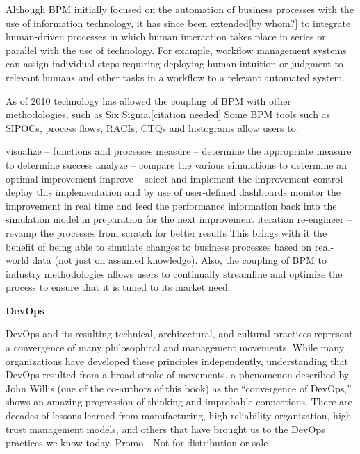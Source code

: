 \documentclass[finnish,12pt,a4paper,pdftex]{article}
\begin{document}
Although BPM initially focused on the automation of business processes with the use of information technology, it has since been extended[by whom?] to integrate human-driven processes in which human interaction takes place in series or parallel with the use of technology. For example, workflow management systems can assign individual steps requiring deploying human intuition or judgment to relevant humans and other tasks in a workflow to a relevant automated system.

As of 2010 technology has allowed the coupling of BPM with other methodologies, such as Six Sigma.[citation needed] Some BPM tools such as SIPOCs, process flows, RACIs, CTQs and histograms allow users to:

visualize – functions and processes
measure – determine the appropriate measure to determine success
analyze – compare the various simulations to determine an optimal improvement
improve – select and implement the improvement
control – deploy this implementation and by use of user-defined dashboards monitor the improvement in real time and feed the performance information back into the simulation model in preparation for the next improvement iteration
re-engineer – revamp the processes from scratch for better results
This brings with it the benefit of being able to simulate changes to business processes based on real-world data (not just on assumed knowledge). Also, the coupling of BPM to industry methodologies allows users to continually streamline and optimize the process to ensure that it is tuned to its market need.

\textbf{DevOps}

DevOps and its resulting technical, architectural, and cultural practices represent
a convergence of many philosophical and management movements.
While many organizations have developed these principles independently,
understanding that DevOps resulted from a broad stroke of movements, a
phenomenon described by John Willis (one of the co-authors of this book) as
the “convergence of DevOps,” shows an amazing progression of thinking and
improbable connections. There are decades of lessons learned from manufacturing,
high reliability organization, high-trust management models, and
others that have brought us to the DevOps practices we know today.
Promo - Not for distribution or sale
\end{document}
